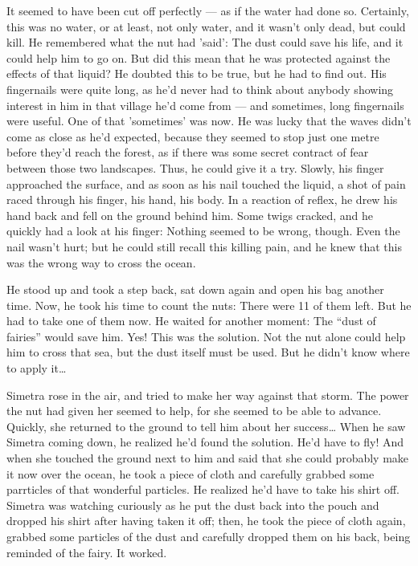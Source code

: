 It seemed to have been cut off perfectly --- as if the water had done so. Certainly, this was no water, or at least, not only water, and it wasn't only dead, but could kill. 
He remembered what the nut had 'said': The dust could save his life, and it could help him to go on. But did this mean that he was protected against the effects of that liquid? He doubted this to be true, but he had to find out. His fingernails were quite long, as he'd never had to think about anybody showing interest in him in that village he'd come from --- and sometimes, long fingernails were useful. One of that 'sometimes' was now. He was lucky that the waves didn't come as close as he'd expected, because they seemed to stop just one metre before they'd reach the forest, as if there was some secret contract of fear between those two landscapes. Thus, he could give it a try. Slowly, his finger approached the surface, and as soon as his nail touched the liquid, a shot of pain raced through his finger, his hand, his body. In a reaction of reflex, he drew his hand back and fell on the ground behind him. Some twigs cracked, and he quickly had a look at his finger: Nothing seemed to be wrong, though. Even the nail wasn't hurt; but he could still recall this killing pain, and he knew that this was the wrong way to cross the ocean.

He stood up and took a step back, sat down again and open his bag another time. Now, he took his time to count the nuts: There were 11 of them left. 
But he had to take one of them now. He waited for another moment: The \enquote{dust of fairies} would save him. Yes! This was the solution. Not the nut alone could help him to cross that sea, but the dust itself must be used. But he didn't know where to apply it\dots

Simetra rose in the air, and tried to make her way against that storm. The power the nut had given her seemed to help, for she seemed to be able to advance. Quickly, she returned to the ground to tell him about her success\dots
When he saw Simetra coming down, he realized he'd found the solution. He'd have to fly! And when she touched the ground next to him and said that she could probably make it now over the ocean, he took a piece of cloth and carefully grabbed some parrticles of that wonderful particles. He realized he'd have to take his shirt off. Simetra was watching curiously as he put the dust back into the pouch and dropped his shirt after having taken it off; then, he took the piece of cloth again, grabbed some particles of the dust and carefully dropped them on his back, being reminded of the fairy. 
It worked.

